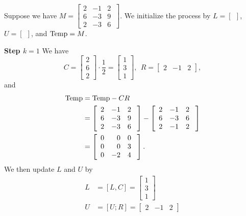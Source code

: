Suppose we have $M=\left[ \begin{array}{rrr} 2 & -1 & 2\\
 6 & -3& 9 \\ 2 & -3 & 6  \end{array}\ \right].$ We initialize the process by $L=[~~]$, $U=[~~]$, and ${\rm Temp}=M$. 
 
 \textbf{Step $k=1$}  We have
 $$C=  \left[\begin{array}{r} 2 \\ 6 \\ 2 \end{array} \right] \cdot \frac{1}{2} =\left[\begin{array}{r} 1 \\ 3 \\ 1 \end{array} \right] ,~~R=\left[\begin{array}{rrr} 2 & -1 & 2 \end{array} \right], $$
 and
\begin{align*}
    {\rm Temp}&  =  {\rm Temp} -  CR \medskip\\ 
 &=\left[ \begin{array}{rrr} 2 & -1 & 2\\
 6 & -3& 9 \\ 2 & -3 & 6  \end{array}\ \right] -  \left[ \begin{array}{rrr} 2 & -1 & 2\\
 6 & -3& 6 \\ 2 & -1 & 2  \end{array}\ \right]\\
 &=  \left[ \begin{array}{rrr} 0 & 0 & 0\\
 0 & 0& 3 \\0 &-2 & 4  \end{array}\ \right].
\end{align*}
We then update $L$ and $U$ by
\begin{align*}
L&= [L,C]=\left[\begin{array}{r} 1 \\ 3 \\ 1 \end{array} \right] \\
U&= [U;R]= \left[\begin{array}{rrr} 2 & -1 & 2 \end{array} \right] \\
\end{align*}

